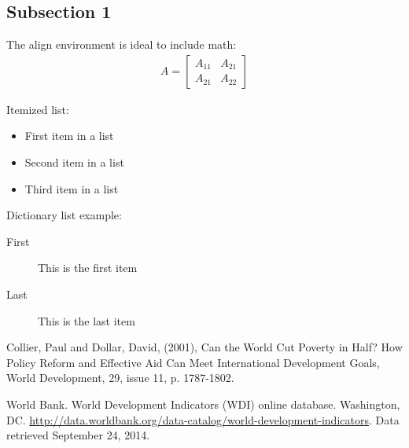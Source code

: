 \documentclass[11pt, twocolumn]{article}
\begin{document}
\subsection*{Subsection 1}

The align environment is ideal to include math:
\begin{align}
A = 
\begin{bmatrix}
A_{11} & A_{21} \\
A_{21} & A_{22}
\end{bmatrix}
\end{align}

Itemized list:
\begin{itemize}
\item First item in a list 
\item Second item in a list 
\item Third item in a list
\end{itemize}

Dictionary list example:
\begin{description}
\item[First] This is the first item
\item[Last] This is the last item
\end{description}



\begin{thebibliography}{9}

Collier, Paul and Dollar, David, (2001), Can the World Cut Poverty in Half? How Policy Reform and Effective Aid Can Meet International Development Goals, World Development, 29, issue 11, p. 1787-1802.

World Bank. World Development Indicators (WDI) online database. Washington, DC. \url{http://data.worldbank.org/data-catalog/world-development-indicators}. Data retrieved September 24, 2014.

\end{thebibliography}

\end{document}
